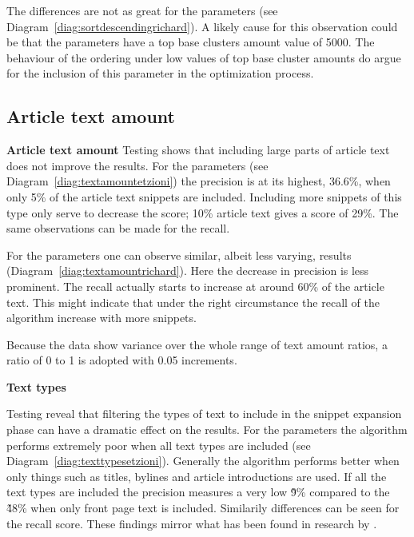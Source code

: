 The differences are not as great for the \citeauthor{Moe2013} parameters (see Diagram~\ref{diag:sortdescendingrichard}). A likely cause for this observation could be that the \citeauthor{Moe2013} parameters have a top base clusters amount value of 5000. The behaviour of the ordering under low values of top base cluster amounts do argue for the inclusion of this parameter in the optimization process.

\subsection{Article text amount}

\textbf{Article text amount}
Testing shows that including large parts of article text does not improve the results. For the \citeauthor{Oren1998} parameters (see Diagram~\ref{diag:textamountetzioni}) the precision is at its highest, 36.6\%, when only 5\% of the article text snippets are included. Including more snippets of this type only serve to decrease the score; 10\% article text gives a score of 29\%. The same observations can be made for the recall.

For the \citeauthor{Moe2013} parameters one can observe similar, albeit less varying, results (Diagram~\ref{diag:textamountrichard}). Here the decrease in precision is less prominent. The recall actually starts to increase at around 60\% of the article text. This might indicate that under the right circumstance the recall of the algorithm increase with more snippets.

Because the data show variance over the whole range of text amount ratios, a ratio of 0 to 1 is adopted with 0.05 increments.

\textbf{Text types}

Testing reveal that filtering the types of text to include in the snippet expansion phase can have a dramatic effect on the results. For the \citeauthor{Oren1998} parameters the algorithm performs extremely poor when all text types are included (see Diagram~\ref{diag:texttypesetzioni}). Generally the algorithm performs better when only things such as titles, bylines and article introductions are used. If all the text types are included the precision measures a very low \~ 9\% compared to the \~ 48\% when only front page text is included. Similarily differences can be seen for the recall score. These findings mirror what has been found in research by \cite{Oren1998}.

